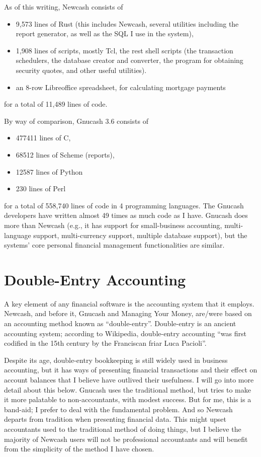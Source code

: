 \documentclass{report}
\begin{document}
As of this writing, Newcash consists of 
\begin{itemize}
\item 9,573 lines of Rust (this includes Newcash, several utilities including the report generator, as well as the SQL I use in the system),
\item 1,908 lines of scripts, mostly Tcl, the rest shell scripts (the transaction schedulers, the database creator and converter, the program for obtaining security quotes, and other useful utilities).
\item an 8-row Libreoffice spreadsheet, for calculating mortgage payments
\end{itemize}

for a total of 11,489 lines of code. 
   
By way of comparison, Gnucash 3.6 consists of 
\begin{itemize}
\item 477411 lines of C,
\item 68512 lines of Scheme (reports),
\item 12587 lines of Python
\item 230 lines of Perl
\end{itemize}
for a total of 558,740 lines of code in 4 programming languages. The Gnucash developers have written almost 49 times as much code as I have. Gnucash does more than Newcash (e.g., it has support for small-business accounting, multi-language support, multi-currency support, multiple database support), but the systems' core personal financial management functionalities are similar.

\chapter{Double-Entry Accounting}
\label{Double-entry}
A key element of any financial software is the accounting system that it employs. Newcash, and before it, Gnucash and Managing Your Money, are/were based on an accounting method known as ``double-entry''. Double-entry is an ancient accounting system; according to Wikipedia, double-entry accounting ``was first codified in the 15th century by the Franciscan friar Luca Pacioli''.

Despite its age, double-entry bookkeeping is still widely used in business accounting, but it has ways of presenting financial transactions and their effect on account balances that I believe have outlived their usefulness. I will go into more detail about this below. Gnucash uses the traditional method, but tries to make it more palatable to non-accountants, with modest success. But for me, this is a band-aid; I prefer to deal with the fundamental problem. And so Newcash departs from tradition when presenting financial data. This might upset accountants used to the traditional method of doing things, but I believe the majority of Newcash users will not be professional accountants and will benefit from the simplicity of the method I have chosen.
\end{document}
